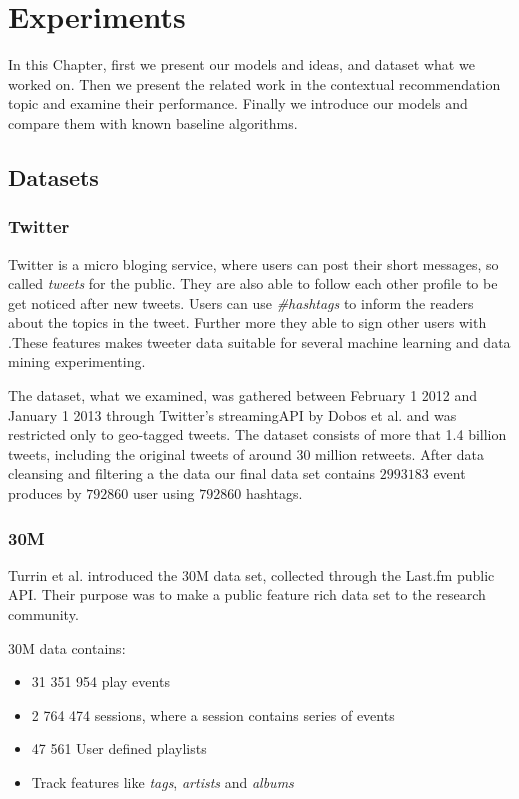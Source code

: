 \chapter{Experiments} \label{ch:res}
In this Chapter, first we present our models and ideas,  and dataset what we worked on. Then we present the 
related work in the contextual recommendation topic and examine their performance. Finally we 
introduce our  models and compare them with known baseline algorithms. 

\section{Datasets}
\subsection{Twitter}
Twitter is a micro bloging  service, where users can post their short messages, so called \emph{tweets} 
for the public. They are also able to follow each other profile to be get noticed after new tweets. 
Users can use \emph{\#hashtags} to inform the readers about the topics in the tweet. Further more they 
able to sign other users with \emph{\@mention}.These features makes tweeter data suitable for several 
machine learning and data mining experimenting.

The dataset, what we examined, was gathered between February 1 2012 and January 1 2013
through Twitter's streamingAPI \cite{twitterapi} by Dobos et al.\cite{dobos2013multi}
and was restricted only to geo-tagged tweets. The dataset consists of more that 1.4 billion 
tweets, including the original tweets of around 30 million retweets. After data cleansing 
and filtering a the data our final data set contains $2 993 183$ event produces by $792 860$ user
using $792 860$ hashtags.
\subsection{30M}
Turrin et al.\cite{turrin30music} introduced the 30M data set, collected through the Last.fm public API.
Their purpose was to make a public feature rich data set to the research community. 

30M  data contains: 
\begin{itemize}
    \item 31 351 954 play events
    \item 2 764 474 sessions, where a session contains series of events
    \item 47 561 User defined playlists
    \item Track features like \emph{tags}, \emph{artists} and \emph{albums}
\end{itemize}

